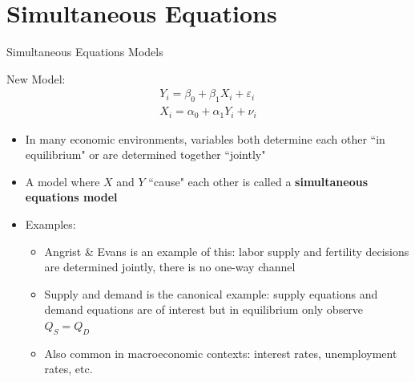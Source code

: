 \documentclass[aspectratio=169,11pt]{beamer}
\begin{document}







\section{Simultaneous Equations}
\begin{frame}{Simultaneous Equations Models}

New Model:
\begin{align*}
	Y_i = \beta_0 + \beta_1 X_i + \varepsilon_i\\
	X_i = \alpha_0 + \alpha_1 Y_i + \nu_i
\end{align*}

\begin{itemize}
	\item In many economic environments, variables both determine each other ``in equilibrium" or are determined together ``jointly"
	\item A model where $X$ and $Y$ ``cause" each other	is called a {\bf simultaneous equations model}
	\item Examples:
		\begin{itemize}
			\item Angrist \& Evans is an example of this: labor supply and fertility decisions are determined jointly, there is no one-way channel
			\item Supply and demand is the canonical example: supply equations and demand equations are of interest but in equilibrium only observe $Q_S=Q_D$
			\item Also common in macroeconomic contexts: interest rates, unemployment rates, etc.
		\end{itemize}
\end{itemize}

\end{frame}
\end{document}
